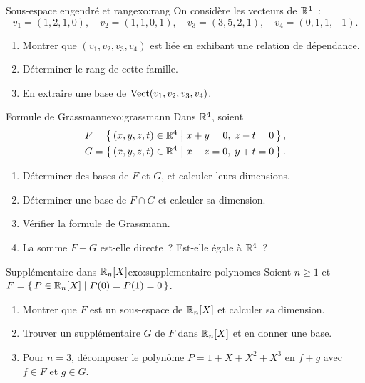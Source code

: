 \begin{exercise}{\intermediate{} Sous-espace engendré et rang}{exo:rang}
  On considère les vecteurs de ${\mathbb{R}}^4$~:
  \[
    v_1=(1,2,1,0),\quad v_2=(1,1,0,1),\quad
    v_3=(3,5,2,1),\quad v_4=(0,1,1,-1).
  \]
  \begin{enumerate}[label=(\alph*)]
    \item Montrer que $(v_1,v_2,v_3,v_4)$ est liée en exhibant une
      relation de dépendance.
    \item Déterminer le rang de cette famille.
    \item En extraire une base de $\operatorname{Vect}(v_1,v_2,v_3,v_4)$.
  \end{enumerate}
\end{exercise}

\begin{exercise}{\intermediate{} Formule de Grassmann}{exo:grassmann}
  Dans ${\mathbb{R}}^4$, soient
  \begin{align*}
    F &= \left\{\,(x,y,z,t)\in{\mathbb{R}}^4\;\middle|\;x+y=0,\;z-t=0\,\right\}, \\
    G &= \left\{\,(x,y,z,t)\in{\mathbb{R}}^4\;\middle|\;x-z=0,\;y+t=0\,\right\}.
  \end{align*}
  \begin{enumerate}[label=(\alph*)]
    \item Déterminer des bases de $F$ et $G$, et calculer leurs
      dimensions.
    \item Déterminer une base de $F\cap G$ et calculer sa dimension.
    \item Vérifier la formule de Grassmann.
    \item La somme $F+G$ est-elle directe~? Est-elle égale à ${\mathbb{R}}^4$~?
  \end{enumerate}
\end{exercise}

\begin{exercise}{\challenging{} Supplémentaire dans ${\mathbb{R}}_n[X]$}{exo:supplementaire-polynomes}
  Soient $n\geq 1$ et $F=\left\{\,P\in{\mathbb{R}}_n[X]\;\middle|\;P(0)=P(1)=0\,\right\}$.
  \begin{enumerate}[label=(\alph*)]
    \item Montrer que $F$ est un sous-espace de ${\mathbb{R}}_n[X]$ et calculer
      sa dimension.
    \item Trouver un supplémentaire $G$ de $F$ dans ${\mathbb{R}}_n[X]$ et en
      donner une base.
    \item Pour $n=3$, décomposer le polynôme $P=1+X+X^2+X^3$ en $f+g$
      avec $f\in F$ et $g\in G$.
  \end{enumerate}
\end{exercise}

